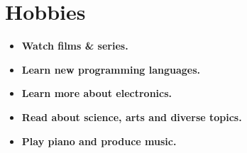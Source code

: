 \documentclass[letterpaper]{twentysecondcv} %
\begin{document}
\section{Hobbies}

\begin{itemize}
    \item \textbf{Watch films \& series.}
    \item \textbf{Learn new programming languages.}
    \item \textbf{Learn more about electronics.}
    \item \textbf{Read about science, arts and diverse topics.}
    \item \textbf{Play piano and produce music.}
\end{itemize}
\end{document}
